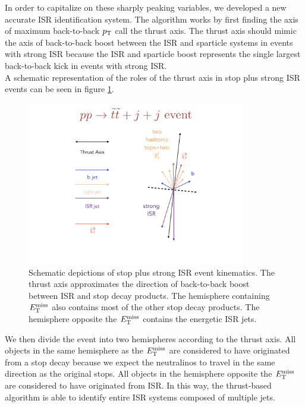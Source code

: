 \indent In order to capitalize on these sharply peaking variables, we developed a new accurate ISR identification system.  The algorithm works by first finding the axis of maximum back-to-back $p_{\mathrm{T}}$ call the thrust axis.  The thrust axis should mimic the axis of back-to-back boost between the ISR and sparticle systems in events with strong ISR because the ISR and sparticle boost represents the single largest back-to-back kick in events with strong ISR.  \\

\indent A schematic representation of the roles of the thrust axis in stop plus strong ISR events can be seen in figure \ref{fig:ISR:ttbar_sig_example}. \\

\begin{figure}[h!]
  \centering
	\includegraphics[width=0.85\textwidth]{./figures/strategy/ISR_signal.png}
	\caption{Schematic depictions of stop plus strong ISR event kinematics.  The thrust axis approximates the direction of back-to-back boost between ISR and stop decay products.  The hemisphere containing $E_{\mathrm{T}}^{\mathrm{miss}}$ also contains most of the other stop decay products.  The hemisphere opposite the $E_{\mathrm{T}}^{\mathrm{miss}}$ contains the energetic ISR jets. }
	\label{fig:ISR:ttbar_sig_example}
\end{figure}

\indent We then divide the event into two hemispheres according to the thrust axis.  All objects in the same hemisphere as the $E_{\mathrm{T}}^{\mathrm{miss}}$ are considered to have originated from a stop decay because we expect the neutralinos to travel in the same direction as the original stops.  All objects in the hemisphere opposite the $E_{\mathrm{T}}^{\mathrm{miss}}$ are considered to have originated from ISR.  In this way, the thrust-based algorithm is able to identify entire ISR systems composed of multiple jets.  \\ 


